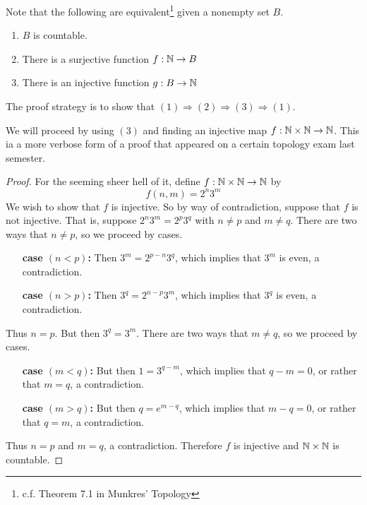 \documentclass{article}
\begin{document}
Note that the following are equivalent\footnote{c.f. Theorem 7.1 in Munkres' Topology} given a
nonempty set $B$.
\begin{enumerate}
    \item $B$ is countable.
    \item There is a surjective function $f : \mathbb{N} \to B$
    \item There is an injective function $g : B \to \mathbb{N}$
\end{enumerate}
The proof strategy is to show that $(1) \Rightarrow (2) \Rightarrow (3) \Rightarrow (1)$.

We will proceed by using $(3)$ and finding an injective map $f : \mathbb{N} \times \mathbb{N} \to \mathbb{N}$. This ia a
more verbose form of a proof that appeared on a certain topology exam last semester.

\begin{proof}
    For the seeming sheer hell of it, define $f : \mathbb{N} \times \mathbb{N} \to \mathbb{N}$ by
    \[f(n, m) = 2^n 3^m\]
    We wish to show that $f$ is injective. So by way of contradiction, suppose that $f$ is not
    injective. That is, suppose $2^n3^m = 2^p3^q$ with $n \neq p$ and $m \neq q$. There are two
    ways that $n \neq p$, so we proceed by cases.
    \begin{itemize}
        \item[\textbf{case $(n < p)$:}] Then $3^m = 2^{p - n}3^q$, which implies that $3^m$ is
              even, a contradiction.
        \item[\textbf{case $(n > p)$:}] Then $3^q = 2^{n - p}3^m$, which implies that $3^q$ is
              even, a contradiction.
    \end{itemize}
    Thus $n = p$. But then $3^q = 3^m$. There are two ways that $m \neq q$, so we proceed by cases.
    \begin{itemize}
        \item[\textbf{case $(m < q)$:}] But then $1 = 3^{q - m}$, which implies that $q - m = 0$,
              or rather that $m = q$, a contradiction.
        \item[\textbf{case $(m > q)$:}] But then $q = e^{m - q}$, which implies that $m - q = 0$,
              or rather that $q = m$, a contradiction.
    \end{itemize}
    Thus $n = p$ and $m = q$, a contradiction. Therefore $f$ is injective and $\mathbb{N} \times \mathbb{N}$ is
    countable.
\end{proof}
\end{document}
